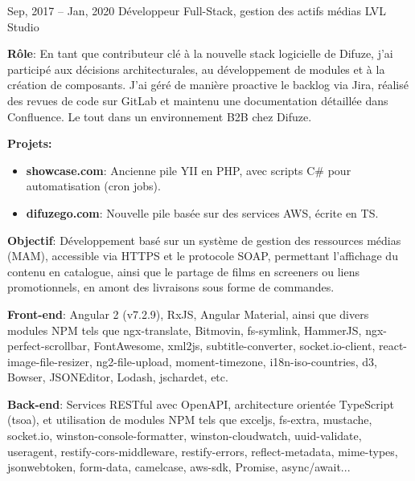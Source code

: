 \documentclass[
  a4paper,
   maincolor=cvblue,
   sectioncolor=cvblue,
   sidebarwidth=0.323\paperwidth,
]{fortysecondscv}
\begin{document}
\begin{cvtableNew}
  \vspace{1.6mm}



  \cvitemRightNew
    {Sep, 2017 – Jan, 2020} %
    {Développeur Full-Stack, gestion des actifs médias} %
    {LVL Studio} %
      {
        \vspace{0.2pt} %
        \fontsize{10.8pt}{12pt}\selectfont %
        \textbf{Rôle}: En tant que contributeur clé à la nouvelle stack logicielle de Difuze, j’ai participé aux décisions architecturales, au développement de modules et à la création de composants. J’ai géré de manière proactive le backlog via Jira, réalisé des revues de code sur GitLab et maintenu une documentation détaillée dans Confluence. Le tout dans un environnement B2B chez Difuze.\vspace{5pt}

        \vspace{0.1pt} %
        \textbf{Projets:}
        \begin{itemize}[itemsep=1mm, topsep=5pt, leftmargin=8pt]
          \item \textbf{showcase.com}: Ancienne pile YII en PHP, avec scripts C\# pour automatisation (cron jobs).
          \item \textbf{difuzego.com}: Nouvelle pile basée sur des services AWS, écrite en TS.
        \end{itemize}

        \vspace{4pt} %
        \textbf{Objectif}: Développement basé sur un système de gestion des ressources médias (MAM), accessible via HTTPS et le protocole SOAP, permettant l’affichage du contenu en catalogue, ainsi que le partage de films en screeners ou liens promotionnels, en amont des livraisons sous forme de commandes.\vspace{5pt}

        \textbf{Front-end}: Angular 2 (v7.2.9), RxJS, Angular Material, ainsi que divers modules NPM tels que ngx-translate, Bitmovin, fs-symlink, HammerJS, ngx-perfect-scrollbar, FontAwesome, xml2js, subtitle-converter, socket.io-client, react-image-file-resizer, ng2-file-upload, moment-timezone, i18n-iso-countries, d3, Bowser, JSONEditor, Lodash, jschardet, etc.\vspace{5pt}

        \textbf{Back-end}: Services RESTful avec OpenAPI, architecture orientée TypeScript (tsoa), et utilisation de modules NPM tels que exceljs, fs-extra, mustache, socket.io, winston-console-formatter, winston-cloudwatch, uuid-validate, useragent, restify-cors-middleware, restify-errors, reflect-metadata, mime-types, jsonwebtoken, form-data, camelcase, aws-sdk, Promise, async/await...\vspace{5pt}

}
\end{cvtableNew}
\end{document}
